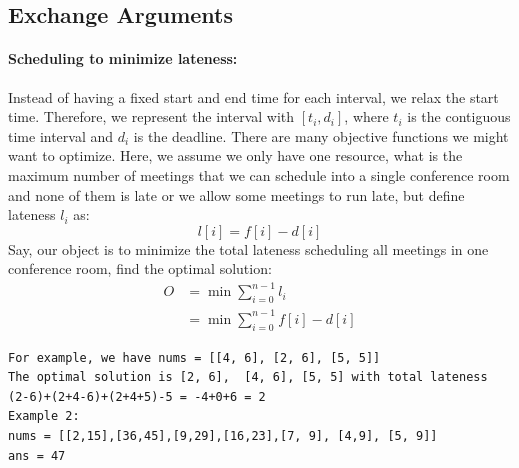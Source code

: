 \documentclass[../main.tex]{subfiles}
\begin{document}
\subsection{Exchange Arguments}


\paragraph{Scheduling to minimize lateness: } Instead of having a fixed start and end time for each interval, we relax the start time. Therefore, we represent the interval with $[t_i, d_i]$, where $t_i$ is the contiguous time interval and $d_i$ is the deadline. There are many objective functions we might want to optimize. Here, we assume we only have one resource, what is the maximum number of meetings that we can schedule into a single conference room and none of them is late or we allow some meetings to run late, but define lateness $l_i$ as:
\begin{equation}
    l[i] =
    f[i] - d[i]
\end{equation}
Say, our object is to minimize the total lateness scheduling all meetings in one conference room, find the optimal solution: 
\begin{align}
    O&=\min \sum_{i=0}^{n-1} l_i\\
    &=\min \sum_{i=0}^{n-1} f[i] - d[i]
\end{align}
\begin{lstlisting}[numbers=none]
For example, we have nums = [[4, 6], [2, 6], [5, 5]]
The optimal solution is [2, 6],  [4, 6], [5, 5] with total lateness  (2-6)+(2+4-6)+(2+4+5)-5 = -4+0+6 = 2
Example 2:
nums = [[2,15],[36,45],[9,29],[16,23],[7, 9], [4,9], [5, 9]]
ans = 47
\end{lstlisting}
\end{document}
